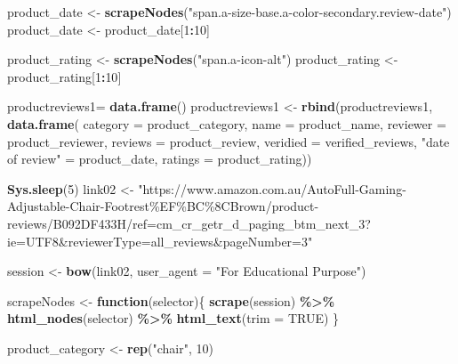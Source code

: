 \documentclass[
]{article}
\newenvironment{Shaded}{\begin{snugshade}}{\end{snugshade}}
\newcommand{\AttributeTok}[1]{\textcolor[rgb]{0.13,0.29,0.53}{#1}}
\newcommand{\ConstantTok}[1]{\textcolor[rgb]{0.56,0.35,0.01}{#1}}
\newcommand{\ControlFlowTok}[1]{\textcolor[rgb]{0.13,0.29,0.53}{\textbf{#1}}}
\newcommand{\DecValTok}[1]{\textcolor[rgb]{0.00,0.00,0.81}{#1}}
\newcommand{\FunctionTok}[1]{\textcolor[rgb]{0.13,0.29,0.53}{\textbf{#1}}}
\newcommand{\NormalTok}[1]{#1}
\newcommand{\OtherTok}[1]{\textcolor[rgb]{0.56,0.35,0.01}{#1}}
\newcommand{\SpecialCharTok}[1]{\textcolor[rgb]{0.81,0.36,0.00}{\textbf{#1}}}
\newcommand{\StringTok}[1]{\textcolor[rgb]{0.31,0.60,0.02}{#1}}
\begin{document}
\begin{Shaded}
\begin{Highlighting}[]
\NormalTok{  product\_date }\OtherTok{\textless{}{-}} \FunctionTok{scrapeNodes}\NormalTok{(}\StringTok{"span.a{-}size{-}base.a{-}color{-}secondary.review{-}date"}\NormalTok{)}
\NormalTok{  product\_date }\OtherTok{\textless{}{-}}\NormalTok{ product\_date[}\DecValTok{1}\SpecialCharTok{:}\DecValTok{10}\NormalTok{]}
  
\NormalTok{  product\_rating }\OtherTok{\textless{}{-}} \FunctionTok{scrapeNodes}\NormalTok{(}\StringTok{"span.a{-}icon{-}alt"}\NormalTok{)}
\NormalTok{  product\_rating }\OtherTok{\textless{}{-}}\NormalTok{ product\_rating[}\DecValTok{1}\SpecialCharTok{:}\DecValTok{10}\NormalTok{]}
  
\NormalTok{  productreviews1}\OtherTok{=} \FunctionTok{data.frame}\NormalTok{()}
\NormalTok{  productreviews1 }\OtherTok{\textless{}{-}} \FunctionTok{rbind}\NormalTok{(productreviews1, }\FunctionTok{data.frame}\NormalTok{(}
                      \AttributeTok{category =}\NormalTok{ product\_category,}
                      \AttributeTok{name =}\NormalTok{ product\_name,}
                      \AttributeTok{reviewer =}\NormalTok{ product\_reviewer,}
                      \AttributeTok{reviews =}\NormalTok{ product\_review,}
                      \AttributeTok{veridied =}\NormalTok{ verified\_reviews,}
                      \StringTok{"date of review"} \OtherTok{=}\NormalTok{ product\_date,}
                      \AttributeTok{ratings =}\NormalTok{ product\_rating))}

  
 \FunctionTok{Sys.sleep}\NormalTok{(}\DecValTok{5}\NormalTok{)}
\NormalTok{link02 }\OtherTok{\textless{}{-}} \StringTok{"https://www.amazon.com.au/AutoFull{-}Gaming{-}Adjustable{-}Chair{-}Footrest\%EF\%BC\%8CBrown/product{-}reviews/B092DF433H/ref=cm\_cr\_getr\_d\_paging\_btm\_next\_3?ie=UTF8\&reviewerType=all\_reviews\&pageNumber=3"}


\NormalTok{  session }\OtherTok{\textless{}{-}} \FunctionTok{bow}\NormalTok{(link02,}
               \AttributeTok{user\_agent =} \StringTok{"For Educational Purpose"}\NormalTok{)}

\NormalTok{  scrapeNodes }\OtherTok{\textless{}{-}} \ControlFlowTok{function}\NormalTok{(selector)\{}
    \FunctionTok{scrape}\NormalTok{(session) }\SpecialCharTok{\%\textgreater{}\%}
      \FunctionTok{html\_nodes}\NormalTok{(selector) }\SpecialCharTok{\%\textgreater{}\%}
      \FunctionTok{html\_text}\NormalTok{(}\AttributeTok{trim =} \ConstantTok{TRUE}\NormalTok{)}
\NormalTok{  \}}

\NormalTok{  product\_category }\OtherTok{\textless{}{-}} \FunctionTok{rep}\NormalTok{(}\StringTok{"chair"}\NormalTok{, }\DecValTok{10}\NormalTok{)}


\end{Highlighting}
\end{Shaded}
\end{document}
